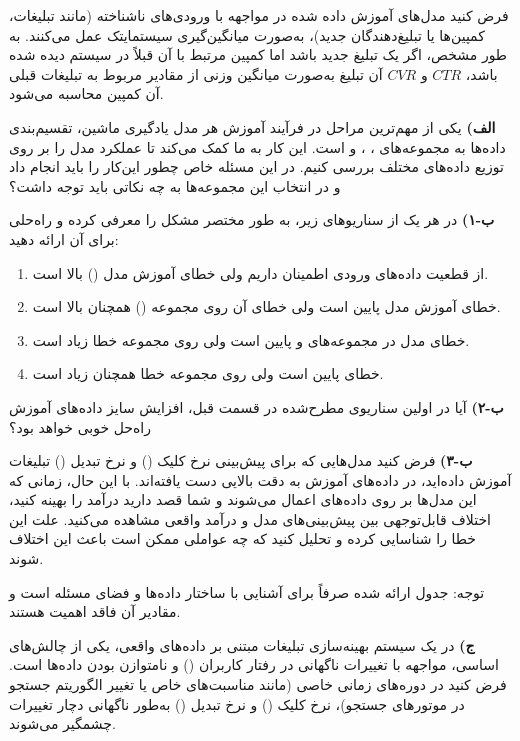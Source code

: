\documentclass[12pt]{article}
\begin{document}
\begin{enumerate}
    فرض کنید مدل‌های آموزش داده شده در مواجهه با ورودی‌های ناشناخته (مانند تبلیغات، کمپین‌ها یا تبلیغ‌دهندگان جدید)، به‌صورت میانگین‌گیری سیستمایتک عمل می‌کنند. به طور مشخص، اگر یک تبلیغ جدید باشد اما کمپین مرتبط با آن قبلاً در سیستم دیده شده باشد، \( CTR \) و \( CVR \) آن تبلیغ به‌صورت میانگین وزنی از مقادیر مربوط به تبلیغات قبلی آن کمپین محاسبه می‌شود.
    
    \textbf{الف)}
    یکی از مهم‌ترین مراحل در فرآیند آموزش هر مدل یادگیری ماشین، تقسیم‌بندی داده‌ها به مجموعه‌های ، ،  و  است. این کار به ما کمک می‌کند تا عملکرد مدل را بر روی توزیع داده‌های مختلف بررسی کنیم. در این مسئله خاص چطور این‌کار را باید انجام داد و در انتخاب این مجموعه‌ها به چه نکاتی باید توجه داشت؟
    
    \textbf{ب-۱)}
    در هر یک از سناریوهای زیر، به طور مختصر مشکل را معرفی کرده و راه‌حلی برای آن ارائه دهید:
    \begin{enumerate}
        \item از قطعیت داده‌های ورودی اطمینان داریم ولی خطای آموزش مدل () بالا است.
        \item خطای آموزش مدل پایین است ولی خطای آن روی مجموعه () همچنان بالا است.
        \item خطای مدل در مجموعه‌های  و  پایین است ولی روی مجموعه  خطا زیاد است.
        \item خطای  پایین است ولی روی مجموعه  خطا همچنان زیاد است.
    \end{enumerate}
    
    \textbf{ب-۲)}
    آیا در اولین سناریوی مطرح‌شده در قسمت قبل، افزایش سایز داده‌های آموزش راه‌حل خوبی خواهد بود؟
    
    \textbf{ب-۳)}
    فرض کنید مدل‌هایی که برای پیش‌بینی نرخ کلیک () و نرخ تبدیل () تبلیغات آموزش داده‌اید، در داده‌های آموزش به دقت بالایی دست یافته‌اند. با این حال، زمانی که این مدل‌ها بر روی داده‌های  اعمال می‌شوند و شما قصد دارید درآمد را بهینه کنید، اختلاف قابل‌توجهی بین پیش‌بینی‌های مدل و درآمد واقعی مشاهده می‌کنید. علت این خطا را شناسایی کرده و تحلیل کنید که چه عواملی ممکن است باعث این اختلاف شوند.
    
    توجه: جدول ارائه شده صرفاً برای آشنایی با ساختار داده‌ها و فضای مسئله است و مقادیر آن فاقد اهمیت هستند.
    
    \textbf{ج)}
    در یک سیستم بهینه‌سازی تبلیغات مبتنی بر داده‌های واقعی، یکی از چالش‌های اساسی، مواجهه با تغییرات ناگهانی در رفتار کاربران () و نامتوازن بودن داده‌ها است. فرض کنید در دوره‌های زمانی خاصی (مانند مناسبت‌های خاص یا تغییر الگوریتم جستجو در موتورهای جستجو)، نرخ کلیک () و نرخ تبدیل () به‌طور ناگهانی دچار تغییرات چشمگیر می‌شوند.
    

\end{enumerate}
\end{document}
